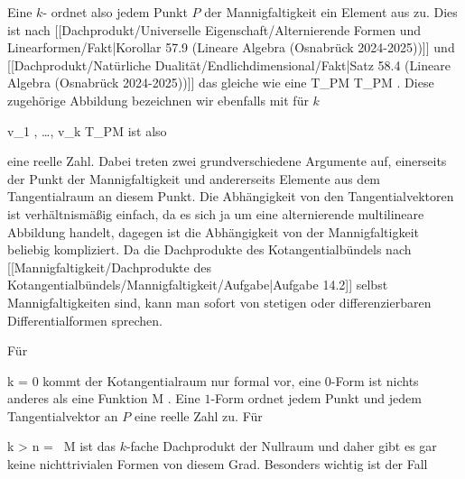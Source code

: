 {}
{

Eine $k$-
ordnet also jedem Punkt $P$ der Mannigfaltigkeit ein Element aus
 zu. Dies ist
nach [[Dachprodukt/Universelle Eigenschaft/Alternierende Formen und Linearformen/Fakt|Korollar 57.9 (Lineare Algebra (Osnabrück 2024-2025))]]
und [[Dachprodukt/Natürliche Dualität/Endlichdimensional/Fakt|Satz 58.4 (Lineare Algebra (Osnabrück 2024-2025))]]
das gleiche wie eine
\maabbdisp {} {T_PM \times \cdots \times T_PM } { \R
} {.}
Diese zugehörige Abbildung bezeichnen wir ebenfalls mit
 für $k$

\mavergleichskette
{\vergleichskette
{ v_1 , \ldots , v_k
}
{ \in }{ T_PM
}
{  }{
}
{    }{
}
{   }{
}
}
{}{}{}
ist also

 {  }

eine reelle Zahl. Dabei treten zwei grundverschiedene Argumente auf, einerseits der Punkt der Mannigfaltigkeit und andererseits Elemente aus dem Tangentialraum an diesem Punkt. Die Abhängigkeit von den Tangentialvektoren ist verhältnismäßig einfach, da es sich ja um eine alternierende multilineare Abbildung handelt, dagegen ist die Abhängigkeit von der Mannigfaltigkeit beliebig kompliziert. Da die Dachprodukte des Kotangentialbündels nach
[[Mannigfaltigkeit/Dachprodukte des Kotangentialbündels/Mannigfaltigkeit/Aufgabe|Aufgabe 14.2]]
selbst Mannigfaltigkeiten sind, kann man sofort von stetigen oder
 {} {}
differenzierbaren Differentialformen sprechen.

Für

\mavergleichskette
{\vergleichskette
{ k
}
{ = }{ 0
}
{  }{
}
{    }{
}
{   }{
}
}
{}{}{}
kommt der Kotangentialraum nur formal vor, eine $0$-Form ist nichts anderes als eine Funktion
 { M } {\R
} {.}
Eine $1$-Form
 {} {}
ordnet jedem Punkt und jedem Tangentialvektor an $P$ eine reelle Zahl zu. Für

\mavergleichskette
{\vergleichskette
{k
}
{ > }{ n
}
{ = }{  \, M
}
{    }{
}
{   }{
}
}
{}{}{}
ist das $k$-fache Dachprodukt der Nullraum und daher gibt es gar keine nichttrivialen Formen von diesem Grad. Besonders wichtig ist der Fall

}
